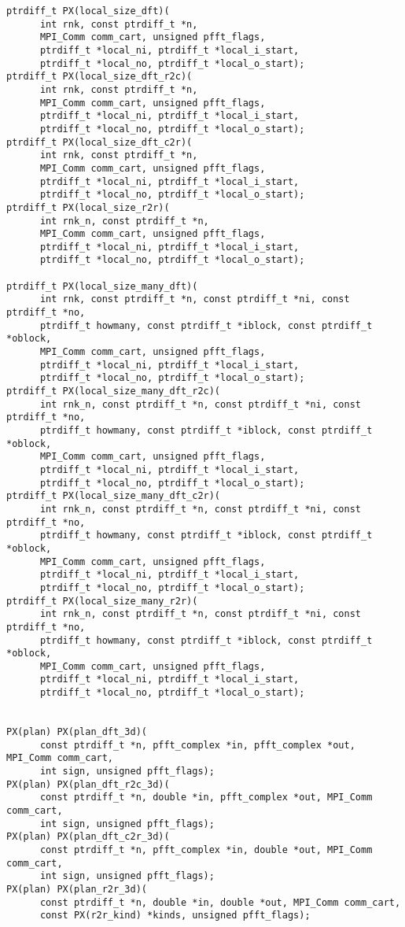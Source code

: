 \begin{lstlisting}
ptrdiff_t PX(local_size_dft)(
      int rnk, const ptrdiff_t *n,
      MPI_Comm comm_cart, unsigned pfft_flags,
      ptrdiff_t *local_ni, ptrdiff_t *local_i_start,
      ptrdiff_t *local_no, ptrdiff_t *local_o_start);
ptrdiff_t PX(local_size_dft_r2c)(
      int rnk, const ptrdiff_t *n,
      MPI_Comm comm_cart, unsigned pfft_flags,
      ptrdiff_t *local_ni, ptrdiff_t *local_i_start,
      ptrdiff_t *local_no, ptrdiff_t *local_o_start);
ptrdiff_t PX(local_size_dft_c2r)(
      int rnk, const ptrdiff_t *n,
      MPI_Comm comm_cart, unsigned pfft_flags,
      ptrdiff_t *local_ni, ptrdiff_t *local_i_start,
      ptrdiff_t *local_no, ptrdiff_t *local_o_start);
ptrdiff_t PX(local_size_r2r)(
      int rnk_n, const ptrdiff_t *n,
      MPI_Comm comm_cart, unsigned pfft_flags,
      ptrdiff_t *local_ni, ptrdiff_t *local_i_start,
      ptrdiff_t *local_no, ptrdiff_t *local_o_start);

ptrdiff_t PX(local_size_many_dft)(
      int rnk, const ptrdiff_t *n, const ptrdiff_t *ni, const ptrdiff_t *no,
      ptrdiff_t howmany, const ptrdiff_t *iblock, const ptrdiff_t *oblock,
      MPI_Comm comm_cart, unsigned pfft_flags,
      ptrdiff_t *local_ni, ptrdiff_t *local_i_start,
      ptrdiff_t *local_no, ptrdiff_t *local_o_start);
ptrdiff_t PX(local_size_many_dft_r2c)(
      int rnk_n, const ptrdiff_t *n, const ptrdiff_t *ni, const ptrdiff_t *no,
      ptrdiff_t howmany, const ptrdiff_t *iblock, const ptrdiff_t *oblock,
      MPI_Comm comm_cart, unsigned pfft_flags,
      ptrdiff_t *local_ni, ptrdiff_t *local_i_start,
      ptrdiff_t *local_no, ptrdiff_t *local_o_start);
ptrdiff_t PX(local_size_many_dft_c2r)(
      int rnk_n, const ptrdiff_t *n, const ptrdiff_t *ni, const ptrdiff_t *no,
      ptrdiff_t howmany, const ptrdiff_t *iblock, const ptrdiff_t *oblock,
      MPI_Comm comm_cart, unsigned pfft_flags,
      ptrdiff_t *local_ni, ptrdiff_t *local_i_start,
      ptrdiff_t *local_no, ptrdiff_t *local_o_start);
ptrdiff_t PX(local_size_many_r2r)(
      int rnk_n, const ptrdiff_t *n, const ptrdiff_t *ni, const ptrdiff_t *no,
      ptrdiff_t howmany, const ptrdiff_t *iblock, const ptrdiff_t *oblock,
      MPI_Comm comm_cart, unsigned pfft_flags,
      ptrdiff_t *local_ni, ptrdiff_t *local_i_start,
      ptrdiff_t *local_no, ptrdiff_t *local_o_start);


PX(plan) PX(plan_dft_3d)(
      const ptrdiff_t *n, pfft_complex *in, pfft_complex *out, MPI_Comm comm_cart,
      int sign, unsigned pfft_flags);
PX(plan) PX(plan_dft_r2c_3d)(
      const ptrdiff_t *n, double *in, pfft_complex *out, MPI_Comm comm_cart,
      int sign, unsigned pfft_flags);
PX(plan) PX(plan_dft_c2r_3d)(
      const ptrdiff_t *n, pfft_complex *in, double *out, MPI_Comm comm_cart,
      int sign, unsigned pfft_flags);
PX(plan) PX(plan_r2r_3d)(
      const ptrdiff_t *n, double *in, double *out, MPI_Comm comm_cart,
      const PX(r2r_kind) *kinds, unsigned pfft_flags);


\end{lstlisting}
